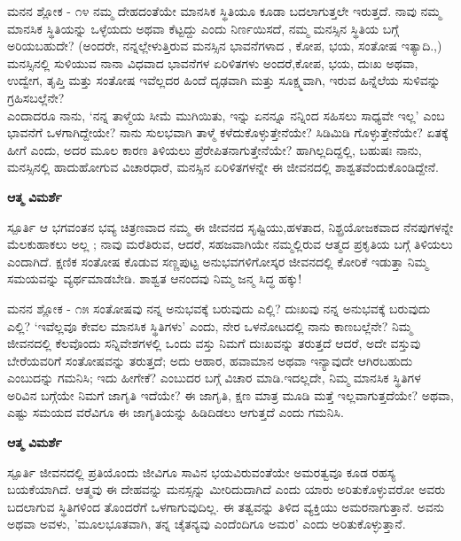 \begin{mananam}{\mananamfont ಮನನ ಶ್ಲೋಕ - ೧೪}
\footnotesize \mananamtext ನಮ್ಮ ದೇಹದಂತೆಯೇ ಮಾನಸಿಕ ಸ್ಥಿತಿಯೂ ಕೂಡಾ ಬದಲಾಗುತ್ತಲೇ ಇರುತ್ತದೆ. ನಾವು ನಮ್ಮ ಮಾನಸಿಕ ಸ್ಥಿತಿಯನ್ನು ಒಳ್ಳೆಯದು ಅಥವಾ ಕೆಟ್ಟದ್ದು ಎಂದು ನಿರ್ಣಯಿಸದೆ, ನಮ್ಮ ಮನಸ್ಸಿನ ಸ್ಥಿತಿಯ ಬಗ್ಗೆ ಅರಿಯಬಹುದೇ? (ಅಂದರೇ, ನನ್ನಲ್ಲೇಳುತ್ತಿರುವ ಮನಸ್ಸಿನ ಭಾವನೆಗಳಾದ , ಕೋಪ,  ಭಯ, ಸಂತೋಷ ಇತ್ಯಾದಿ.,) ಮನಸ್ಸಿನಲ್ಲಿ ಸುಳಿಯುವ ನಾನಾ ವಿಧವಾದ ಭಾವನೆಗಳ ಏರಿಳಿತಗಳು ಅಂದರೆ,ಕೋಪ, ಭಯ, ದುಃಖ ಅಥವಾ, ಉದ್ವೇಗ, ತೃಪ್ತಿ ಮತ್ತು ಸಂತೋಷ ಇವೆಲ್ಲದರ ಹಿಂದೆ ದೃಢವಾಗಿ ಮತ್ತು ಸೂಕ್ಷ್ಮವಾಗಿ, ಇರುವ ಹಿನ್ನೆಲೆಯ ಸುಳಿವನ್ನು ಗ್ರಹಿಸಬಲ್ಲೆನೇ?\\
ಎಂದಾದರೂ ನಾನು, ‘ನನ್ನ ತಾಳ್ಮೆಯ ಸೀಮೆ ಮುಗಿಯಿತು, ಇನ್ನು ಏನನ್ನೂ ನನ್ನಿಂದ ಸಹಿಸಲು ಸಾಧ್ಯವೇ ಇಲ್ಲ’ ಎಂಬ ಭಾವನೆಗೆ ಒಳಗಾಗಿದ್ದೇಯೇ? ನಾನು ಸುಲಭವಾಗಿ ತಾಳ್ಮೆ ಕಳೆದುಕೊಳ್ಳುತ್ತೇನೆಯೇ? ಸಿಡಿಮಿಡಿ ಗೊಳ್ಳುತ್ತೇನೆಯೇ? ಏತಕ್ಕೆ ಹೀಗೆ ಎಂದು, ಅದರ ಮೂಲ ಕಾರಣ ತಿಳಿಯಲು ಪ್ರೆರೇಪಿತನಾಗುತ್ತೇನೆಯೇ? ಹಾಗಿಲ್ಲದಿದ್ದಲ್ಲಿ,  ಬಹುಷಃ ನಾನು,  ಮನಸ್ಸಿನಲ್ಲಿ ಹಾದುಹೋಗುವ ವಿಚಾರಧಾರೆ, ಮನಸ್ಸಿನ ಏರಿಳಿತಗಳನ್ನೇ ಈ ಜೀವನದಲ್ಲಿ ಶಾಶ್ವತವೆಂದುಕೊಂಡಿದ್ದೇನೆ. 
\end{mananam}
\WritingHand\enspace\textbf{ಆತ್ಮ ವಿಮರ್ಶೆ}
\begin{inspiration}{\mananamfont ಸ್ಪೂರ್ತಿ}
\footnotesize \mananamtext ಆ ಭಗವಂತನ ಭವ್ಯ ಚಿತ್ರಣವಾದ ನಮ್ಮ ಈ ಜೀವನದ ಸೃಷ್ಟಿಯು,ಹಳತಾದ, ನಿಶ್ಪ್ರಯೋಜಕವಾದ ನೆನಪುಗಳನ್ನೇ ಮೆಲಕುಹಾಕಲು ಅಲ್ಲ ; ನಾವು ಮರೆತಿರುವ, ಆದರೆ, ಸಹಜವಾಗಿಯೇ ನಮ್ಮಲ್ಲಿರುವ ಆತ್ಮದ ಪ್ರಕೃತಿಯ ಬಗ್ಗೆ ತಿಳಿಯಲು ಎಂದಾಗಿದೆ. ಕ್ಷಣಿಕ ಸಂತೋಷ ಕೊಡುವ ಸಣ್ಣಪುಟ್ಟ ಅನುಭವಗಳಿಗೋಸ್ಕರ ಜೀವನದಲ್ಲಿ ಕೋರಿಕೆ ಇಡುತ್ತಾ ನಿಮ್ಮ ಸಮಯವನ್ನು ವ್ಯರ್ಥಮಾಡಬೇಡಿ.  ಶಾಶ್ವತ ಆನಂದವು ನಿಮ್ಮ ಜನ್ಮ ಸಿದ್ಧ ಹಕ್ಕು!
\end{inspiration}
\newpage

\begin{mananam}{\mananamfont ಮನನ ಶ್ಲೋಕ - ೧೫}
\footnotesize \mananamtext ಸಂತೋಷವು ನನ್ನ ಅನುಭವಕ್ಕೆ ಬರುವುದು ಎಲ್ಲಿ?  ದುಃಖವು ನನ್ನ ಅನುಭವಕ್ಕೆ ಬರುವುದು ಎಲ್ಲಿ? ‘ಇವೆಲ್ಲವೂ ಕೇವಲ ಮಾನಸಿಕ ಸ್ಥಿತಿಗಳು’ ಎಂದು, ನೇರ ಒಳನೋಟದಲ್ಲಿ ನಾನು ಕಾಣಬಲ್ಲೆನೇ? ನಿಮ್ಮ ಜೀವನದಲ್ಲಿ ಕೆಲವೊಂದು ಸನ್ನಿವೇಶಗಳಲ್ಲಿ ಒಂದು ವಸ್ತು ನಿಮಗೆ ದುಃಖವನ್ನು ತರುತ್ತದೆ ಆದರೆ, ಅದೇ ವಸ್ತುವು ಬೇರೆಯವರಿಗೆ ಸಂತೋಷವನ್ನು ತರುತ್ತದೆ; ಅದು ಆಹಾರ, ಹವಾಮಾನ ಅಥವಾ ಇನ್ಯಾವುದೇ ಆಗಿರಬಹುದು ಎಂಬುದನ್ನು ಗಮನಿಸಿ; ಇದು ಹೀಗೇಕೆ? ಎಂಬುದರ ಬಗ್ಗೆ ವಿಚಾರ ಮಾಡಿ.ಇದಲ್ಲದೇ, ನಿಮ್ಮ ಮಾನಸಿಕ ಸ್ಥಿತಿಗಳ ಅರಿವಿನ ಬಗ್ಗೆಯೇ ನಿಮಗೆ ಜಾಗೃತಿ ಇದೆಯೇ?  ಈ ಜಾಗೃತಿ, ಕ್ಷಣ ಮಾತ್ರ ಮೂಡಿ ಮತ್ತೆ ಇಲ್ಲವಾಗುತ್ತದೆಯೇ? ಅಥವಾ, ಎಷ್ಟು ಸಮಯದ ವರೆವಿಗೂ ಈ ಜಾಗೃತಿಯನ್ನು ಹಿಡಿದಿಡಲು ಆಗುತ್ತದೆ ಎಂದು ಗಮನಿಸಿ.
\end{mananam}
\WritingHand\enspace\textbf{ಆತ್ಮ ವಿಮರ್ಶೆ}
\begin{inspiration}{\mananamfont ಸ್ಪೂರ್ತಿ}
\footnotesize \mananamtext ಜೀವನದಲ್ಲಿ ಪ್ರತಿಯೊಂದು ಜೀವಿಗೂ ಸಾವಿನ ಭಯವಿರುವಂತೆಯೇ ಅಮರತ್ವವೂ ಕೂಡ ರಹಸ್ಯ ಬಯಕೆಯಾಗಿದೆ. ಆತ್ಮವು ಈ ದೇಹವನ್ನು ಮನಸ್ಸನ್ನು ಮೀರಿದುದಾಗಿದೆ ಎಂದು ಯಾರು ಅರಿತುಕೊಳ್ಳುವರೋ ಅವರು ಬದಲಾಗುವ ಸ್ಥಿತಿಗಳಿಂದ ತೊಂದರೆಗೆ ಒಳಗಾಗುವುದಿಲ್ಲ. ಈ ತತ್ವವನ್ನು ತಿಳಿದ ವ್ಯಕ್ತಿಯು ಅಮರನಾಗುತ್ತಾನೆ. ಅವನು ಅಥವಾ ಅವಳು, 'ಮೂಲಭೂತವಾಗಿ, ತನ್ನ ಚೈತನ್ಯವು ಎಂದೆಂದಿಗೂ ಅಮರ' ಎಂದು ಅರಿತುಕೊಳ್ಳುತ್ತಾನೆ.
\end{inspiration}

